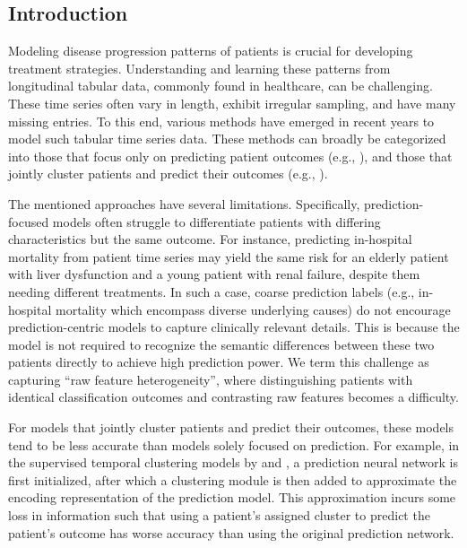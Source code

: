 \subsection{Introduction}

Modeling disease progression patterns of patients is crucial for developing treatment strategies.
Understanding and learning these patterns from longitudinal tabular data, commonly found in healthcare, can be challenging.
These time series often vary in length, exhibit irregular sampling, and have many missing entries.
To this end, various methods have emerged in recent years to model such tabular time series data.
These methods can broadly be categorized into those that focus only on predicting patient outcomes (e.g., \citet{choi2016retain, ma2017dipole, devlin2018bert, mollura2021novel}), and those that jointly cluster patients and predict their outcomes (e.g., \citet{lee2020temporal, lee2020outcome, huang2021deep, carr2021longitudinal, aguiar2022learning, qin2023t}).

The mentioned approaches have several limitations.
Specifically, prediction-focused models often struggle to differentiate patients with differing characteristics but the same outcome. 
For instance, predicting in-hospital mortality from patient time series may yield the same risk for an elderly patient with liver dysfunction and a young patient with renal failure, despite them needing different treatments.
In such a case, coarse prediction labels (e.g., in-hospital mortality which encompass diverse underlying causes) do not encourage prediction-centric models to capture clinically relevant details.
This is because the model is not required to recognize the semantic differences between these two patients directly to achieve high prediction power.
We term this challenge as capturing ``raw feature heterogeneity'', where distinguishing patients with identical classification outcomes and contrasting raw features becomes a difficulty.


For models that jointly cluster patients and predict their outcomes, these models tend to be less accurate than models solely focused on prediction.
For example, in the supervised temporal clustering models by \citet{lee2020temporal} and \citet{aguiar2022learning}, a prediction neural network is first initialized, after which a clustering module is then added to approximate the encoding representation of the prediction model. 
This approximation incurs some loss in information such that using a patient's assigned cluster to predict the patient's outcome has worse accuracy than using the original prediction network.

